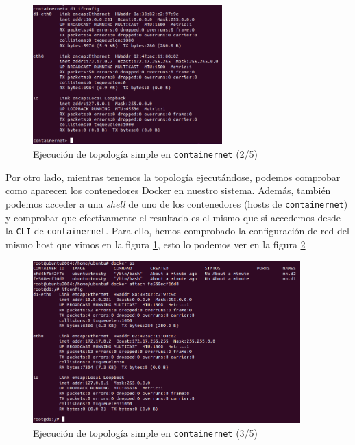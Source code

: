 \documentclass[a4paper, oneside, 12pt]{book}
\begin{document}
	\pagebreak

	\begin{figure}[h!]
		\begin{center}
			\includegraphics[width=0.65\textwidth]{img/cn_example2.png}
			\caption{Ejecución de topología simple en \texttt{containernet} (2/5)}
			\label{img: cn simple 2}
		\end{center}
	\end{figure}

	\noindent Por otro lado, mientras tenemos la topología ejecutándose, podemos comprobar como aparecen los contenedores Docker en nuestro sistema. Además, también podemos acceder a una \textit{shell} de uno de los contenedores (hosts de \texttt{containernet}) y comprobar que efectivamente el resultado es el mismo que si accedemos desde la \texttt{CLI} de \texttt{containernet}. Para ello, hemos comprobado la configuración de red del mismo host que vimos en la figura \ref{img: cn simple 2}, esto lo podemos ver en la figura \ref{img: cn simple 3}

	\begin{figure}[h!]
		\begin{center}
			\includegraphics[width=0.92\textwidth]{img/cn_example3.png}
			\caption{Ejecución de topología simple en \texttt{containernet} (3/5)}
			\label{img: cn simple 3}
		\end{center}
	\end{figure}
\end{document}
